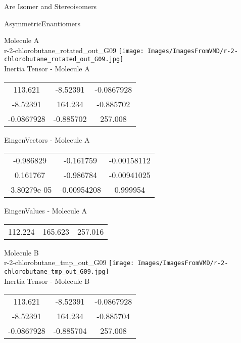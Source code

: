 \begin{center}
\vtab
\vtab
\textcolor{NavyBlue}{\Large Are Isomer and Stereoisomers}
\end{center}
\newpage

\vtab[-2cm]
\begin{center}
{\large AsymmetricEnantiomers}
\end{center}
\begin{multicols}{2}
\begin{center}
Molecule A \\ 
r-2-chlorobutane\_rotated\_out\_G09
\texttt{[image: Images/ImagesFromVMD/r-2-chlorobutane\_rotated\_out\_G09.jpg]}
\\
Inertia Tensor - Molecule A \\
\vtab
\begin{tabular}{|c c c|}
113.621	 & 	-8.52391	 & 	-0.0867928	 \\
-8.52391	 & 	164.234	 & 	-0.885702	 \\
-0.0867928	 & 	-0.885702	 & 	257.008
\end{tabular}

\vtab
 EingenVectors - Molecule A     \\
\vtab
\begin{tabular}{|c c c|}
-0.986829	 & 	-0.161759	 & 	-0.00158112	 \\
0.161767	 & 	-0.986784	 & 	-0.00941025	 \\
-3.80279e-05	 & 	-0.00954208	 & 	0.999954
\end{tabular}

\vtab
 EingenValues - Molecule A     \\
\vtab
\begin{tabular}{|c c c|}
112.224	 & 	165.623	 & 	257.016
\end{tabular}
\columnbreak

Molecule B \\ 
r-2-chlorobutane\_tmp\_out\_G09
\texttt{[image: Images/ImagesFromVMD/r-2-chlorobutane\_tmp\_out\_G09.jpg]}
\\
Inertia Tensor - Molecule B \\
\vtab
\begin{tabular}{|c c c|}
113.621	 & 	-8.52391	 & 	-0.0867928	 \\
-8.52391	 & 	164.234	 & 	-0.885704	 \\
-0.0867928	 & 	-0.885704	 & 	257.008
\end{tabular}


\end{center}
\end{multicols}
